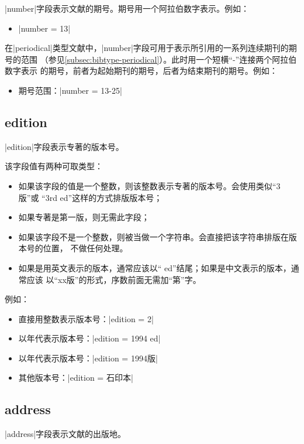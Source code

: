 |number|字段表示文献的期号。期号用一个阿拉伯数字表示。例如：
\begin{itemize}
\item |number = {13}|
\end{itemize}

在|periodical|类型文献中，|number|字段可用于表示所引用的一系列连续期刊的期号的范围
（参见\ref{subsec:bibtype-periodical}）。此时用一个短横``-''连接两个阿拉伯数字表示
的期号，前者为起始期刊的期号，后者为结束期刊的期号。例如：
\begin{itemize}
\item 期号范围：|number = {13-25}|
\end{itemize}


\subsection{edition}\label{subsec:bibfield-edition}

|edition|字段表示专著的版本号。

该字段值有两种可取类型：
\begin{itemize}
\item 如果该字段的值是一个整数，则该整数表示专著的版本号。{\BibTeX}会使用类似``3版''或
``3rd ed''这样的方式排版版本号；
\item 如果专著是第一版，则无需此字段；
\item 如果该字段不是一个整数，则被当做一个字符串。{\BibTeX}会直接把该字符串排版在版本号的位置，
不做任何处理。
\item 如果是用英文表示的版本，通常应该以`` ed''结尾；如果是中文表示的版本，通常应该
以``xx版''的形式，序数前面无需加``第''字。
\end{itemize}

例如：
\begin{itemize}
\item 直接用整数表示版本号：|edition = {2}|
\item 以年代表示版本号：|edition = {1994 ed}|
\item 以年代表示版本号：|edition = {1994版}|
\item 其他版本号：|edition = {石印本}|
\end{itemize}

\subsection{address}\label{subsec:bibfield-address}

|address|字段表示文献的出版地。

